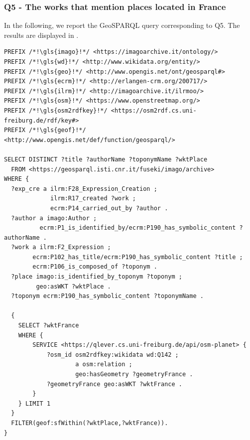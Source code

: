 \subsubsection*{Q5 - The works that mention places located in France}
In the following, we report the GeoSPARQL query corresponding to Q5. The results are displayed in .

\begin{lstlisting}[caption=GeoSPARQL Query 5, label={lst:query5}]
PREFIX /*!\gls{imago}!*/ <https://imagoarchive.it/ontology/>
PREFIX /*!\gls{wd}!*/ <http://www.wikidata.org/entity/>
PREFIX /*!\gls{geo}!*/ <http://www.opengis.net/ont/geosparql#>
PREFIX /*!\gls{ecrm}!*/ <http://erlangen-crm.org/200717/>
PREFIX /*!\gls{ilrm}!*/ <http://imagoarchive.it/ilrmoo/>
PREFIX /*!\gls{osm}!*/ <https://www.openstreetmap.org/>
PREFIX /*!\gls{osm2rdfkey}!*/ <https://osm2rdf.cs.uni-freiburg.de/rdf/key#>
PREFIX /*!\gls{geof}!*/ <http://www.opengis.net/def/function/geosparql/> 

SELECT DISTINCT ?title ?authorName ?toponymName ?wktPlace
  FROM <https://geosparql.isti.cnr.it/fuseki/imago/archive>
WHERE {
  ?exp_cre a ilrm:F28_Expression_Creation ;
  	         ilrm:R17_created ?work ;
  	         ecrm:P14_carried_out_by ?author .	
  ?author a imago:Author ;
          ecrm:P1_is_identified_by/ecrm:P190_has_symbolic_content ?authorName .
  ?work a ilrm:F2_Expression ;
        ecrm:P102_has_title/ecrm:P190_has_symbolic_content ?title ;
        ecrm:P106_is_composed_of ?toponym .
  ?place imago:is_identified_by_toponym ?toponym ;
         geo:asWKT ?wktPlace .
  ?toponym ecrm:P190_has_symbolic_content ?toponymName .

  { 
    SELECT ?wktFrance 
    WHERE {
        SERVICE <https://qlever.cs.uni-freiburg.de/api/osm-planet> { 
            ?osm_id osm2rdfkey:wikidata wd:Q142 ;
                    a osm:relation ;
                    geo:hasGeometry ?geometryFrance .
            ?geometryFrance geo:asWKT ?wktFrance .     
        } 
    } LIMIT 1
  }
  FILTER(geof:sfWithin(?wktPlace,?wktFrance)). 
} 
\end{lstlisting}



